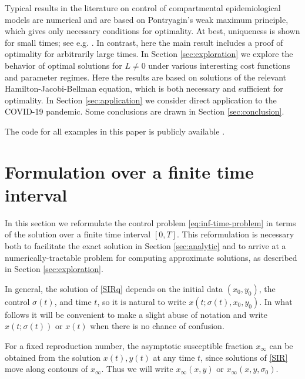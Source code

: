 \documentclass[english,12pt,letter]{article}
\newcommand{\Rnot}{\sigma_0}
\newcommand{\Sinf}{x_\infty}
\begin{document}
Typical results in the literature on control of compartmental epidemiological models
are numerical and are based on Pontryagin's weak maximum principle, which gives only
necessary conditions for optimality.  At best, uniqueness is shown for small times; see e.g. 
\cite{kirschner1997optimal,fister1998optimizing,jung2002optimal,yan2008optimal,kar2011stability,sharomi2017optimal}.
In contrast, here the main result includes a proof of optimality for arbitrarily large times.
In Section \ref{sec:exploration} we explore
the behavior of optimal solutions for $L\ne 0$ under various interesting
cost functions and parameter regimes.  Here the results are based on
solutions of the relevant Hamilton-Jacobi-Bellman equation, which is
both necessary and sufficient for optimality.
In Section \ref{sec:application} we consider direct application to the COVID-19
pandemic.  Some conclusions are drawn in Section \ref{sec:conclusion}.

The code for all examples in this paper is publicly available \cite{ketcheson2021SIRRepro}.

\section{Formulation over a finite time interval\label{sec:prelims}}
In this section we reformulate the control problem \eqref{eq:inf-time-problem} in terms of
the solution over a finite time interval $[0,T]$.  This reformulation is
necessary both to facilitate the exact solution in Section \ref{sec:analytic}
and to arrive at a numerically-tractable problem for computing
approximate solutions, as described in Section \ref{sec:exploration}.


In general, the solution of \eqref{SIRq} depends on the initial data
$(x_0,y_0)$, the control $\sigma(t)$, and time $t$, so it is natural to write
$x(t;\sigma(t),x_0,y_0)$.
In what follows it will be convenient to make a slight abuse of notation and
write $x(t;\sigma(t))$ or $x(t)$ when there is no chance of confusion.

For a fixed reproduction number, the asymptotic susceptible fraction $\Sinf$
can be obtained from the solution $x(t), y(t)$ at any time $t$, since solutions
of \eqref{SIR} move along contours of $\Sinf$.  Thus we will write $\Sinf(x,y)$
or $\Sinf(x,y,\Rnot)$.
\end{document}
